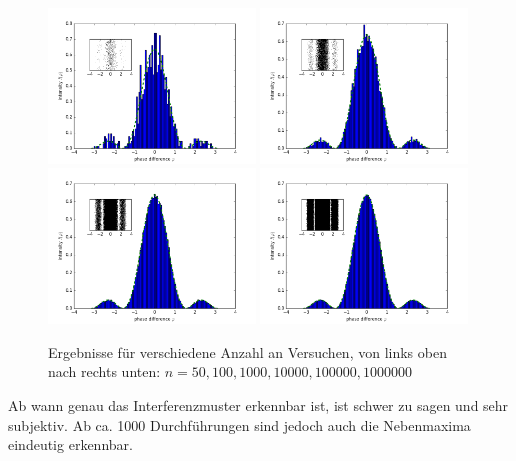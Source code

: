 \begin{enumerate}[(a)]
\begin{figure}[htbp]
\includegraphics[width=0.49\textwidth]{1000.png}
\includegraphics[width=0.49\textwidth]{10000.png}
\includegraphics[width=0.49\textwidth]{100000.png}
\includegraphics[width=0.49\textwidth]{1000000.png}
\caption{Ergebnisse für verschiedene Anzahl an Versuchen, von links oben nach rechts unten: $n=50,100,1000,10000,100000,1000000$}
\label{fig:montecarlo}
\end{figure}
Ab wann genau das Interferenzmuster erkennbar ist, ist schwer zu sagen und sehr subjektiv. Ab ca. 1000 Durchführungen sind jedoch auch die Nebenmaxima eindeutig erkennbar.
\end{enumerate}

